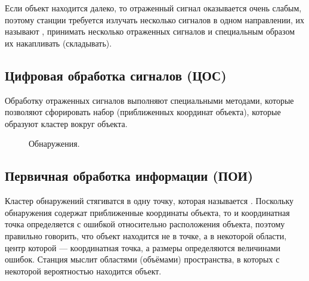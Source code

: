 Если объект находится далеко, то отраженный сигнал оказывается очень слабым, поэтому станции требуется излучать несколько сигналов в одном
направлении, их называют , принимать несколько отраженных сигналов и специальным образом их накапливать (складывать).

\subsection{Цифровая обработка сигналов (ЦОС)}

Обработку отраженных сигналов выполняют специальными методами, которые позволяют сфорировать набор  (приближенных
координат объекта), которые образуют кластер вокруг объекта.

\begin{figure}[!ht]
    \centering
    \caption{Обнаружения.}
\end{figure}

\subsection{Первичная обработка информации (ПОИ)}

Кластер обнаружений стягиватся в одну точку, которая называется . Поскольку обнаружения содержат
приближенные координаты объекта, то и координатная точка определяется с ошибкой относительно расположения объекта, поэтому
правильно говорить, что объект находится не в точке, а в некоторой области, центр которой --- координатная точка, а размеры определяются
величинами ошибок. Станция мыслит областями (объёмами) пространства, в которых с некоторой вероятностью находится объект.

